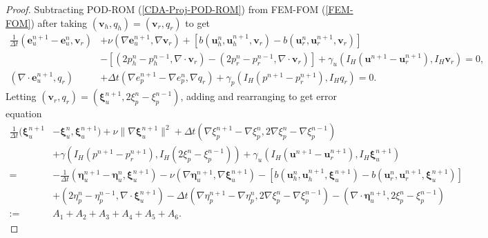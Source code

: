 \documentclass[10pt,twoside,openany,UTF8,CJK]{article}
\begin{document}
	\begin{proof}
	\noindent Subtracting POD-ROM (\ref{CDA-Proj-POD-ROM}) from FEM-FOM (\ref{FEM-FOM}) after taking $(\boldsymbol{v}_h,q_h) = (\boldsymbol{v}_r,q_r)$ to get
	\begin{equation}\label{ErroEqua-1}
	\begin{aligned}
		\frac{1}{\Delta t}(\boldsymbol{e}^{n+1}_u - \boldsymbol{e}^n_u,\boldsymbol{v}_r) &+ \nu(\nabla \boldsymbol{e}^{n+1}_u, \nabla \boldsymbol{v}_r) + [b(\boldsymbol{u}^n_h,\boldsymbol{u}^{n+1}_h,\boldsymbol{v}_r) - b(\boldsymbol{u}^n_r,\boldsymbol{u}^{n+1}_r,\boldsymbol{v}_r)] \\
		&- [(2p^n_h-p^{n-1}_h, \nabla\cdot \boldsymbol{v}_r) - (2p^n_r-p^{n-1}_r, \nabla\cdot \boldsymbol{v}_r)] + \gamma_u(I_H(\boldsymbol{u}^{n+1} - \boldsymbol{u}^{n+1}_r), I_H\boldsymbol{v}_r)= 0, \\
		(\nabla\cdot \boldsymbol{e}^{n+1}_u, q_r) &+ \Delta t(\nabla e^{n+1}_p - \nabla e^n_p, \nabla q_r) + \gamma_p(I_H(p^{n+1} - p^{n+1}_r), I_Hq_r) = 0.
	\end{aligned}
    \end{equation}		
	Letting $(\boldsymbol{v}_r, q_r) = (\boldsymbol{\xi}^{n+1}_u, 2\xi^n_p-\xi^{n-1}_p)$, adding and rearranging to get error equation
	\begin{equation}\label{ErroEqua-2}
	\begin{aligned}
		\frac{1}{\Delta t}(\boldsymbol{\xi}^{n+1}_u &- \boldsymbol{\xi}^n_u, \boldsymbol{\xi}^{n+1}_u) + \nu\|\nabla \boldsymbol{\xi}^{n+1}_u\|^2 + \Delta t(\nabla \xi^{n+1}_p - \nabla \xi^n_p, 2\nabla\xi^n_p-\nabla\xi^{n-1}_p) \\
		&+ \gamma(I_H(p^{n+1} - p^{n+1}_r), I_H(2\xi^n_p-\xi^{n-1}_p)) + \gamma_u(I_H(\boldsymbol{u}^{n+1} - \boldsymbol{u}^{n+1}_r), I_H\boldsymbol{\xi}^{n+1}_u)\\
		=& -\frac{1}{\Delta t}\left(\boldsymbol{\eta}^{n+1}_u - \boldsymbol{\eta}^n_u, \boldsymbol{\xi}^{n+1}_u\right) - \nu(\nabla\boldsymbol{\eta}^{n+1}_u, \nabla\boldsymbol{\xi}^{n+1}_u) - [b(\boldsymbol{u}^n_h,\boldsymbol{u}^{n+1}_h, \boldsymbol{\xi}^{n+1}_u) - b(\boldsymbol{u}^n_r,\boldsymbol{u}^{n+1}_r,\boldsymbol{\xi}^{n+1}_u)] \\
		&+ (2\eta^n_p-\eta^{n-1}_p, \nabla\cdot \boldsymbol{\xi}^{n+1}_u) - \Delta t(\nabla \eta^{n+1}_p - \nabla \eta^n_p, 2\nabla\xi^n_p-\nabla\xi^{n-1}_p) - (\nabla\cdot \boldsymbol{\eta}^{n+1}_u, 2\xi^n_p-\xi^{n-1}_p) \\
		:=& A_1 + A_2 + A_3 + A_4 + A_5 + A_6.
	\end{aligned}

\end{equation}
\end{proof}
\end{document}
